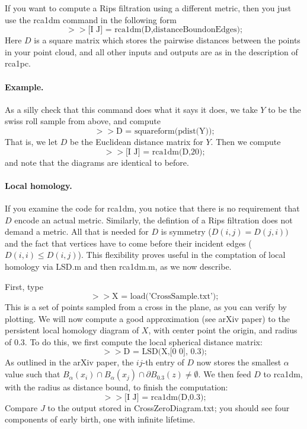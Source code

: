 \documentclass[a4paper,10pt]{article}
\begin{document}
If you want to compute a Rips filtration using a different metric, then you just use the rca1dm command
in the following form
$$ >> \mbox {[I J] = rca1dm(D,distanceBoundonEdges);}$$
Here $D$ is a square matrix which stores the pairwise distances between the points in your point cloud,
and all other inputs and outputs are as in the description of rca1pc.

\paragraph{Example.}

As a silly check that this command does what it says it does, we take $Y$ to be the swiss roll sample
from above, and compute
$$>> \mbox{D = squareform(pdist(Y));}$$
That is, we let $D$ be the Euclidean distance matrix for $Y$.
Then we compute
$$ >> \mbox {[I J] = rca1dm(D,20);}$$
and note that the diagrams are identical to before.

\paragraph{Local homology.}

If you examine the code for rca1dm, you notice that there is no requirement that $D$ encode an actual metric.
Similarly, the defintion of a Rips filtration does not demand a metric.
All that is needed for $D$ is symmetry ($D(i,j) = D(j,i))$ and 
the fact that vertices have to come before their incident edges ($D(i,i) \leq D(i,j)$).
This flexibility proves useful in the comptation of local homology via LSD.m and then rca1dm.m, as we now describe.

First, type
$$ >> \mbox{X = load('CrossSample.txt');}$$
This is a set of points sampled from a cross in the plane, as you can verify by plotting.
We will now compute a good approximation (see arXiv paper) to the persistent local homology
diagram of $X$, with center point the origin, and radius of $0.3$.
To do this, we first compute the local spherical distance matrix:
$$ >> \mbox{D = LSD(X,[0 0], 0.3);}$$
As outlined in the arXiv paper, the $ij$-th entry of $D$ now stores the smallest $\alpha$ value
such that $B_{\alpha}(x_i) \cap B_{\alpha}(x_j) \cap \partial B_{0.3}(z) \neq \emptyset.$
We then feed $D$ to rca1dm, with the radius as distance bound, to finish the computation:
$$  >> \mbox{[I J] = rca1dm(D,0.3);}$$
Compare $J$ to the output stored in CrossZeroDiagram.txt; you should see four components of early birth, one with infinite lifetime.
\end{document}
